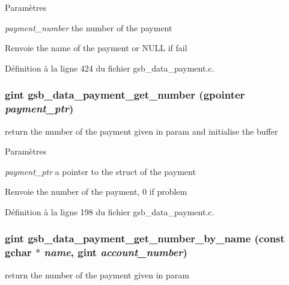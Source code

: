 \begin{DoxyParams}{Paramètres}
\item[{\em payment\_\-number}]the number of the payment\end{DoxyParams}
\begin{DoxyReturn}{Renvoie}
the name of the payment or NULL if fail 
\end{DoxyReturn}


Définition à la ligne 424 du fichier gsb\_\-data\_\-payment.c.

\subsubsection[{gsb\_\-data\_\-payment\_\-get\_\-number}]{\setlength{\rightskip}{0pt plus 5cm}gint gsb\_\-data\_\-payment\_\-get\_\-number (gpointer {\em payment\_\-ptr})}\label{gsb__data__payment_8c_ad8738991cf8066d32f2a9a76f465f941}
return the number of the payment given in param and initialise the buffer


\begin{DoxyParams}{Paramètres}
\item[{\em payment\_\-ptr}]a pointer to the struct of the payment\end{DoxyParams}
\begin{DoxyReturn}{Renvoie}
the number of the payment, 0 if problem 
\end{DoxyReturn}


Définition à la ligne 198 du fichier gsb\_\-data\_\-payment.c.

\subsubsection[{gsb\_\-data\_\-payment\_\-get\_\-number\_\-by\_\-name}]{\setlength{\rightskip}{0pt plus 5cm}gint gsb\_\-data\_\-payment\_\-get\_\-number\_\-by\_\-name (const gchar $\ast$ {\em name}, \/  gint {\em account\_\-number})}\label{gsb__data__payment_8c_a84385c444819731fbdddb56c553ed2e0}
return the number of the payment given in param


